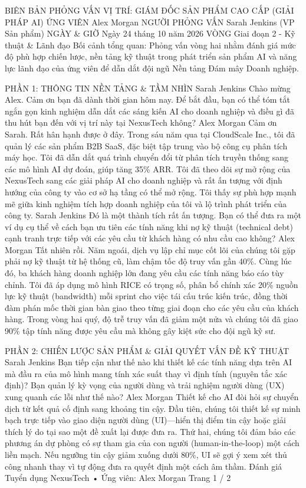 BIÊN BẢN PHỎNG VẤN
VỊ TRÍ: GIÁM ĐỐC SẢN PHẨM CAO CẤP (GIẢI PHÁP AI)
ỨNG VIÊN
Alex Morgan
NGƯỜI PHỎNG VẤN
Sarah Jenkins (VP Sản phẩm)
NGÀY \& GIỜ
Ngày 24 tháng 10 năm 2026
VÒNG
Giai đoạn 2 - Kỹ thuật \& Lãnh đạo
Bối cảnh tổng quan: Phỏng vấn vòng hai nhằm đánh giá mức độ phù hợp chiến lược, nền tảng kỹ thuật trong phát triển sản phẩm AI và năng lực lãnh đạo của ứng viên để dẫn dắt đội ngũ Nền tảng Đám mây Doanh nghiệp.

PHẦN 1: THÔNG TIN NỀN TẢNG \& TẦM NHÌN
Sarah Jenkins
Chào mừng Alex. Cảm ơn bạn đã dành thời gian hôm nay. Để bắt đầu, bạn có thể tóm tắt ngắn gọn kinh nghiệm dẫn dắt các sáng kiến AI cho doanh nghiệp và điều gì đã thu hút bạn đến với vị trí này tại NexusTech không?
Alex Morgan
Cảm ơn Sarah. Rất hân hạnh được ở đây. Trong sáu năm qua tại CloudScale Inc., tôi đã quản lý các sản phẩm B2B SaaS, đặc biệt tập trung vào bộ công cụ phân tích máy học. Tôi đã dẫn dắt quá trình chuyển đổi từ phân tích truyền thống sang các mô hình AI dự đoán, giúp tăng 35\% ARR. Tôi đã theo dõi sự mở rộng của NexusTech sang các giải pháp AI cho doanh nghiệp và rất ấn tượng với định hướng của công ty vào cơ sở hạ tầng có thể mở rộng. Tôi thấy sự phù hợp mạnh mẽ giữa kinh nghiệm tích hợp doanh nghiệp của tôi và lộ trình phát triển của công ty.
Sarah Jenkins
Đó là một thành tích rất ấn tượng. Bạn có thể đưa ra một ví dụ cụ thể về cách bạn ưu tiên các tính năng khi nợ kỹ thuật (technical debt) cạnh tranh trực tiếp với các yêu cầu từ khách hàng có nhu cầu cao không?
Alex Morgan
Tất nhiên rồi. Năm ngoái, dịch vụ lập chỉ mục cốt lõi của chúng tôi gặp phải nợ kỹ thuật từ hệ thống cũ, làm chậm tốc độ truy vấn gần 40\%. Cùng lúc đó, ba khách hàng doanh nghiệp lớn đang yêu cầu các tính năng báo cáo tùy chỉnh. Tôi đã áp dụng mô hình RICE có trọng số, phân bổ chính xác 20\% nguồn lực kỹ thuật (bandwidth) mỗi sprint cho việc tái cấu trúc kiến trúc, đồng thời đàm phán mốc thời gian bàn giao theo từng giai đoạn cho các yêu cầu của khách hàng. Trong vòng hai quý, độ trễ truy vấn đã giảm một nửa và chúng tôi đã giao 90\% tập tính năng được yêu cầu mà không gây kiệt sức cho đội ngũ kỹ sư.

PHẦN 2: CHIẾN LƯỢC SẢN PHẨM \& GIẢI QUYẾT VẤN ĐỀ KỸ THUẬT
Sarah Jenkins
Bạn tiếp cận như thế nào khi thiết kế các tính năng dựa trên AI mà đầu ra của mô hình mang tính xác suất thay vì định tính (nguyên tắc xác định)? Bạn quản lý kỳ vọng của người dùng và trải nghiệm người dùng (UX) xung quanh các lỗi như thế nào?
Alex Morgan
Thiết kế cho AI đòi hỏi sự chuyển dịch từ kết quả cố định sang khoảng tin cậy. Đầu tiên, chúng tôi thiết kế sự minh bạch trực tiếp vào giao diện người dùng (UI)—hiển thị điểm tin cậy hoặc giải thích lý do tại sao một đề xuất lại được đưa ra. Thứ hai, chúng tôi đảm bảo các phương án dự phòng có sự tham gia của con người (human-in-the-loop) một cách liền mạch. Nếu ngưỡng tin cậy giảm xuống dưới 80\%, UI sẽ gợi ý xem xét thủ công nhanh thay vì tự động đưa ra quyết định một cách âm thầm.
Đánh giá Tuyển dụng NexusTech • Ứng viên: Alex Morgan
Trang 1 / 2

